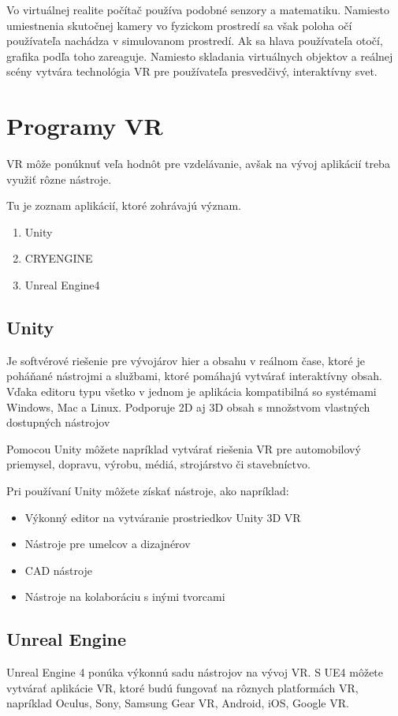\documentclass[10pt,twoside,slovak,a4paper]{article}
\begin{document}
Vo virtuálnej realite počítač používa podobné senzory a matematiku. Namiesto umiestnenia skutočnej kamery vo fyzickom prostredí sa však poloha očí používateľa nachádza v simulovanom prostredí. Ak sa hlava používateľa otočí, grafika podľa toho zareaguje. Namiesto skladania virtuálnych objektov a reálnej scény vytvára technológia VR pre používateľa presvedčivý, interaktívny svet.

\cite{hayes_2021}\vspace{15mm}

\section{Programy VR} \label{ina}
VR môže ponúknuť veľa hodnôt pre vzdelávanie, avšak na vývoj aplikácií treba využiť rôzne nástroje. 

Tu je zoznam aplikácií, ktoré zohrávajú význam.
\begin{enumerate}
\item Unity
\item CRYENGINE
\item Unreal Engine4
\end{enumerate} 

\subsection {Unity}

Je softvérové riešenie pre vývojárov hier a obsahu v reálnom čase, ktoré je poháňané nástrojmi a službami, ktoré pomáhajú vytvárať interaktívny obsah.
Vďaka editoru typu všetko v jednom je aplikácia kompatibilná so systémami Windows, Mac a Linux.
Podporuje 2D aj 3D obsah s množstvom vlastných dostupných nástrojov

Pomocou Unity môžete napríklad vytvárať riešenia VR pre automobilový priemysel, dopravu, výrobu, médiá, strojárstvo či stavebníctvo.

Pri používaní Unity môžete získať nástroje, ako napríklad:
\begin {itemize}
\item Výkonný editor na vytváranie prostriedkov Unity 3D VR
\item Nástroje pre umelcov a dizajnérov
\item CAD nástroje
\item Nástroje na kolaboráciu s inými tvorcami
\end {itemize}
\cite{devteam_2021}

\subsection {Unreal Engine}
Unreal Engine 4  ponúka výkonnú sadu nástrojov na vývoj VR.
S UE4 môžete vytvárať aplikácie VR, ktoré budú fungovať na rôznych platformách VR, napríklad Oculus, Sony, Samsung Gear VR, Android, iOS, Google VR.
\end{document}
